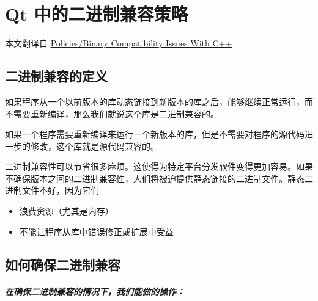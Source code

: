 \section{Qt 中的二进制兼容策略}

本文翻译自
\href{https://link.jianshu.com?t=https://community.kde.org/Policies/Binary\_Compatibility\_Issues\_With\_C\%2B\%2B}{Policies/Binary
Compatibility Issues With C++}

\subsection{二进制兼容的定义}\label{ux4e8cux8fdbux5236ux517cux5bb9ux7684ux5b9aux4e49}

如果程序从一个以前版本的库动态链接到新版本的库之后，能够继续正常运行，而不需要重新编译，那么我们就说这个库是二进制兼容的。

如果一个程序需要重新编译来运行一个新版本的库，但是不需要对程序的源代码进一步的修改，这个库就是源代码兼容的。

二进制兼容性可以节省很多麻烦。这使得为特定平台分发软件变得更加容易。如果不确保版本之间的二进制兼容性，人们将被迫提供静态链接的二进制文件。静态二进制文件不好，因为它们

\begin{itemize}

\item
  浪费资源（尤其是内存）
\item
  不能让程序从库中错误修正或扩展中受益
\end{itemize}

\subsection{如何确保二进制兼容}\label{ux5982ux4f55ux786eux4fddux4e8cux8fdbux5236ux517cux5bb9}

\subparagraph{在确保二进制兼容的情况下，我们能做的操作：}\label{ux5728ux786eux4fddux4e8cux8fdbux5236ux517cux5bb9ux7684ux60c5ux51b5ux4e0bux6211ux4eecux80fdux505aux7684ux64cdux4f5c}

